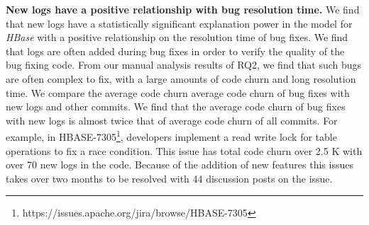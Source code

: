 %	
\textbf{New logs have a positive relationship with bug resolution time.} 
We find that new logs have a statistically significant explanation power in the model for \emph{HBase} with a positive relationship on the resolution time of bug fixes. We find that logs are often added during bug fixes in order to verify the quality of the bug fixing code. From our manual analysis results of RQ2, we find that such bugs are often complex to fix, with a large amounts of code churn and long resolution time. We compare the average code churn average code churn of bug fixes with new logs and other commits. We find that the average code churn of bug fixes with new logs is almost twice that of average code churn of all commits. For example, in HBASE-7305\footnote{https://issues.apache.org/jira/browse/HBASE-7305}, developers implement a read write lock for table operations to fix a race condition. This issue has total code churn over 2.5 K with over 70 new logs in the code. Because of the addition of new features this issues takes over two months to be resolved with 44 discussion posts on the issue. 



